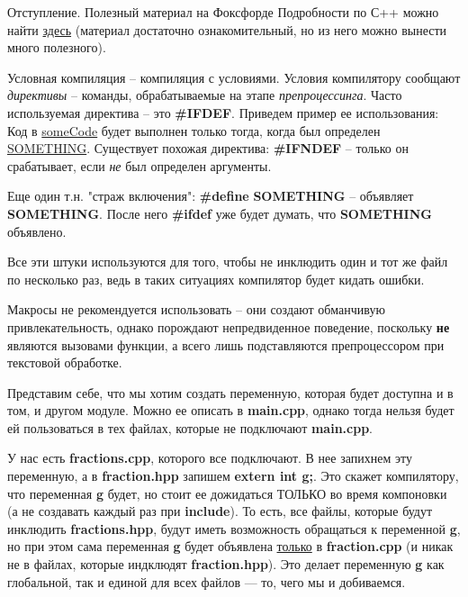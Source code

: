 \begin{lecture}[\lectureSubject]
\begin{lecSection}
		\begin{lecSubsection}{Отступление. Полезный материал на Фоксфорде}
		Подробности по С++ можно найти \href{https://foxford.ru/wiki/informatika/modulnoe-programmirovanie-v-c}{здесь} (материал достаточно ознакомительный, но из него можно вынести много полезного).
		\end{lecSubsection}
	
	\end{lecSection}
	\begin{lecSection}
		Условная компиляция -- компиляция с условиями. Условия компилятору сообщают \textit{директивы} -- команды, обрабатываемые на этапе \textit{препроцессинга}. Часто используемая директива -- это \textbf{\#IFDEF}. Приведем пример ее использования:
		Код в \underline{someCode} будет выполнен только тогда, когда был определен \underline{SOMETHING}. Существует похожая директива: \textbf{\#IFNDEF} -- только он срабатывает, если \textit{не} был определен аргументы.
		
		Еще один т.н. "страж включения": \textbf{\#define} \textbf{SOMETHING} -- объявляет \textbf{SOMETHING}. После него \textbf{\#ifdef} уже будет думать, что \textbf{SOMETHING} объявлено.
		
		Все эти штуки используются для того, чтобы не инклюдить один и тот же файл по несколько раз, ведь в таких ситуациях компилятор будет кидать ошибки.
	\end{lecSection}
	
	\begin{lecSection}[Макросы]
		Макросы не рекомендуется использовать -- они создают обманчивую привлекательность, однако порождают непредвиденное поведение, поскольку \textbf{не} являются вызовами функции, а всего лишь подставляются препроцессором при текстовой обработке.
	\end{lecSection}
	\begin{lecSection}
		Представим себе, что мы хотим создать переменную, которая будет доступна и в том, и другом модуле. Можно ее описать в \textbf{main.cpp}, однако тогда нельзя будет ей пользоваться в тех файлах, которые не подключают \textbf{main.cpp}. 
		
		У нас есть \textbf{fractions.cpp}, которого все подключают. В нее запихнем эту переменную, а в \textbf{fraction.hpp} запишем \textbf{extern int g;}. Это скажет компилятору, что переменная \textbf{g} будет, но стоит ее дожидаться ТОЛЬКО во время компоновки (а не создавать каждый раз при \textbf{include}). То есть, все файлы, которые будут инклюдить \textbf{fractions.hpp}, будут иметь возможность обращаться к переменной \textbf{g}, но при этом сама переменная \textbf{g} будет объявлена \underline{только} в \textbf{fraction.cpp} (и никак не в файлах, которые индклюдят \textbf{fraction.hpp}). Это делает переменную \textbf{g} как глобальной, так и единой для всех файлов --- то, чего мы и добиваемся.
	\end{lecSection}
\end{lecture}

